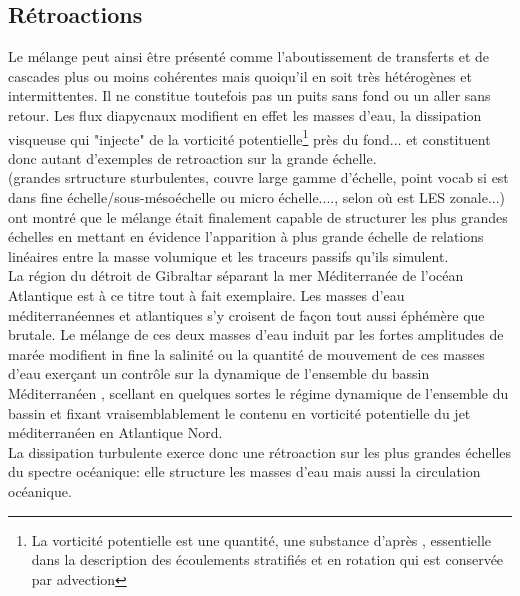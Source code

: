 \subsection{Rétroactions}
\label{subsection_retroactions}
Le mélange peut ainsi être présenté comme l'aboutissement de transferts et de cascades plus ou moins cohérentes mais quoiqu'il en soit très hétérogènes et intermittentes. Il ne constitue toutefois pas un puits sans fond ou un aller sans retour. Les flux diapycnaux modifient en effet les masses d'eau, la dissipation visqueuse qui "injecte" de la vorticité potentielle\footnote{La vorticité potentielle est une quantité, une substance d'après \cite{haynes_conservation_1990}, essentielle dans la description des écoulements stratifiés et en rotation qui est conservée par advection} près du fond... et constituent donc autant d'exemples de retroaction sur la grande échelle.\\
\color{red}(grandes srtructure sturbulentes, couvre large gamme d'échelle, point vocab si est dans fine échelle/sous-mésoéchelle ou micro échelle...., selon où est LES zonale...)\color{blue}\\
\cite{penney_2020} ont montré que le mélange était finalement capable de structurer les plus grandes échelles en mettant en évidence l'apparition à plus grande échelle de relations linéaires entre la masse volumique et les traceurs passifs qu'ils simulent.\\
La région du détroit de Gibraltar séparant la mer Méditerranée de l'océan Atlantique est à ce titre tout à fait exemplaire. Les masses d'eau méditerranéennes et atlantiques s'y croisent de façon tout aussi éphémère que brutale. Le mélange de ces deux masses d'eau induit par les fortes amplitudes de marée modifient in fine la salinité ou la quantité de mouvement de ces masses d'eau exerçant un contrôle sur la dynamique de l'ensemble du bassin Méditerranéen \citep{FA1988}, scellant en quelques sortes le régime dynamique de l'ensemble du bassin et fixant vraisemblablement le contenu en vorticité potentielle du jet méditerranéen en Atlantique Nord.\\
La dissipation turbulente exerce donc une rétroaction sur les plus grandes échelles du spectre océanique: elle  structure les masses d'eau mais aussi la circulation océanique.
\color{black}

